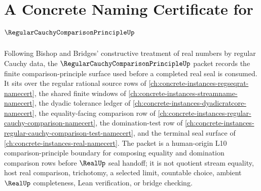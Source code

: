\chapter{A Concrete Naming Certificate for $\RegularCauchyComparisonPrincipleUp$}
\label{ch:concrete-instances-regular-cauchy-comparison-principle-namecert}

Following Bishop and Bridges' constructive treatment of real numbers by regular Cauchy data, the $\RegularCauchyComparisonPrincipleUp$ packet records the finite comparison-principle surface used before a completed real seal is consumed. It sits over the regular rational source rows of \autoref{ch:concrete-instances-regseqrat-namecert}, the shared finite windows of \autoref{ch:concrete-instances-streamname-namecert}, the dyadic tolerance ledger of \autoref{ch:concrete-instances-dyadicratcore-namecert}, the equality-facing comparison row of \autoref{ch:concrete-instances-regular-cauchy-comparison-namecert}, the domination-test row of \autoref{ch:concrete-instances-regular-cauchy-comparison-test-namecert}, and the terminal seal surface of \autoref{ch:concrete-instances-real-namecert}. The packet is a human-origin L10 comparison-principle boundary for composing equality and domination comparison rows before $\RealUp$ seal handoff; it is not quotient stream equality, host real comparison, trichotomy, a selected limit, countable choice, ambient $\RealUp$ completeness, Lean verification, or bridge checking.

